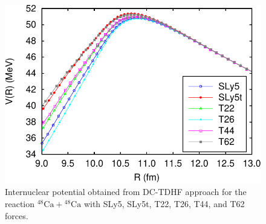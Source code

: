 \begin{figure}
	\includegraphics[width=\textwidth]{../Figures/TensorPot/V5_Ca48Ca48.pdf}
	\caption{Internuclear potential obtained from DC-TDHF approach for the reaction $^{48}\mathrm{Ca}+\mathrm{^{48}Ca}$ with SLy5, SLy5t,
		T22, T26, T44, and T62 forces.
		\label{Fig:TIJ}}
\end{figure}

